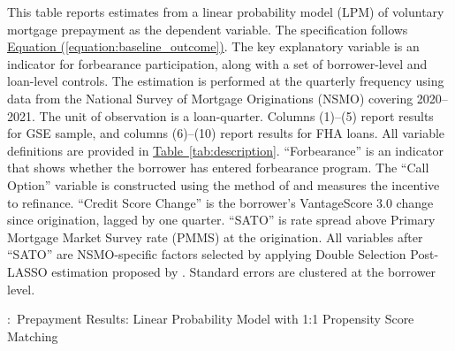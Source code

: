 \documentclass[11pt]{article}
\begin{document}
{\begin{table}[htbp]
\begin{minipage}{\textwidth}
\small
This table reports estimates from a linear probability model (LPM) of voluntary mortgage prepayment as the dependent variable. The specification follows \hyperref[equation:baseline_outcome]{Equation (\ref*{equation:baseline_outcome})}. The key explanatory variable is an indicator for forbearance participation, along with a set of borrower-level and loan-level controls. The estimation is performed at the quarterly frequency using data from the National Survey of Mortgage Originations (NSMO) covering 2020–2021. The unit of observation is a loan-quarter. Columns (1)–(5) report results for GSE sample, and columns (6)–(10) report results for FHA loans. All variable definitions are provided in \hyperref[tab:description]{Table~\ref*{tab:description}}. ``Forbearance'' is an indicator that shows whether the borrower has entered forbearance program. The ``Call Option'' variable is constructed using the method of \citet{deng2000mortgage} and measures the incentive to refinance. ``Credit Score Change'' is the borrower’s VantageScore 3.0 change since origination, lagged by one quarter. ``SATO'' is rate spread above Primary Mortgage Market Survey rate (PMMS) at the origination. All variables after ``SATO'' are NSMO-specific factors selected by applying Double Selection Post-LASSO estimation proposed by \citet{belloni2014inference}. Standard errors are clustered at the borrower level. 

\end{minipage}

\vspace{1em}




\end{table}
\FloatBarrier
\clearpage

\begin{table}[htbp]
\captionsetup{justification=justified,singlelinecheck=false}
\footnotesize
\caption{:\ Prepayment Results: Linear Probability Model with 1:1 Propensity Score Matching}
\label{tab:lpm_prepayment}
\vspace{0.5em}


\end{table}}
\end{document}
